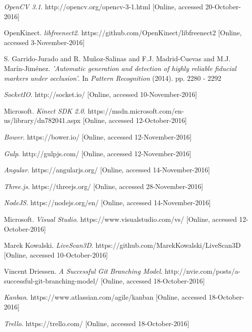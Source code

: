 \documentclass{article}
\begin{document}
\newpage
\renewcommand\refname{Bibliography}

\begin{thebibliography}{9}

  \emph{OpenCV 3.1}.
  http://opencv.org/opencv-3-1.html [Online, accessed 20-October-2016]

  OpenKinect.
  \emph{libfreenect2}.
  https://github.com/OpenKinect/libfreenect2 [Online, accessed 3-November-2016]
 
  S. Garrido-Jurado and R. Mu\~noz-Salinas and F.J. Madrid-Cuevas and M.J. Mar\'in-Jim\'enez.
  \emph{'Automatic generation and detection of highly reliable fiducial markers under occlusion'}.
  In \emph{Pattern Recognition} (2014). 
  pp. 2280 - 2292

  \emph{SocketIO}.
  http://socket.io/ [Online, accessed 10-November-2016]

  Microsoft.
  \emph{Kinect SDK 2.0}.
  https://msdn.microsoft.com/en-us/library/dn782041.aspx [Online, accessed 12-October-2016]
  
  \emph{Bower}.
  https://bower.io/ [Online, accessed 12-November-2016]
  
  \emph{Gulp}.
  http://gulpjs.com/ [Online, accessed 12-November-2016]
  
  \emph{Angular}.
  https://angularjs.org/ [Online, accessed 14-November-2016]
  
  \emph{Three.js}.
  https://threejs.org/ [Online, accessed 28-November-2016]
  
  \emph{NodeJS}.
  https://nodejs.org/en/ [Online, accessed 14-November-2016]

  Microsoft.
  \emph{Visual Studio}.
  https://www.visualstudio.com/vs/ [Online, accessed 12-October-2016]
  
  Marek Kowalski.
  \emph{LiveScan3D}.
  https://github.com/MarekKowalski/LiveScan3D [Online, accessed 10-October-2016]
  
  Vincent Driessen.
  \emph{A Successful Git Branching Model}.
  http://nvie.com/posts/a-successful-git-branching-model/ [Online, accessed 18-October-2016]
  
  \emph{Kanban}.
  https://www.atlassian.com/agile/kanban [Online, accessed 18-October-2016]
  
  \emph{Trello}.
  https://trello.com/ [Online, accessed 18-October-2016]


\end{thebibliography}
\end{document}
